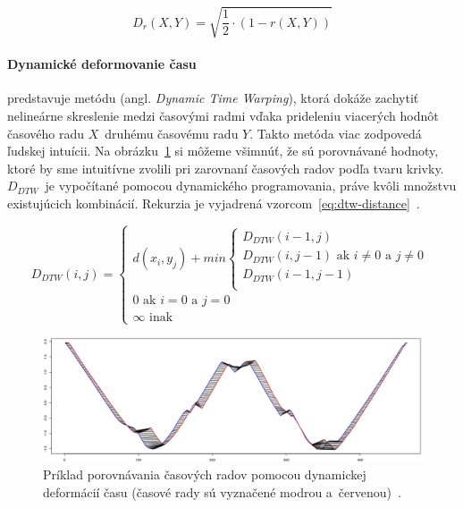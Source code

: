 \documentclass[a4paper,twoside,slovak,12pt,appendix]{article}
\begin{document}
\begin{equation}
	\label{eq:correlation-distance}
  D_r \left( X, Y \right) = \sqrt{\frac{1}{2} \cdot \left( 1 - r \left( X, Y \right) \right)}
\end{equation}


\paragraph{Dynamické deformovanie času} predstavuje metódu (angl.
\textit{Dynamic Time Warping}), ktorá dokáže zachytiť nelineárne skreslenie
medzi časovými radmi vďaka prideleniu viacerých hodnôt časového radu $X$~druhému
časovému radu $Y$. Takto metóda viac zodpovedá ľudskej intuícii. Na
obrázku~\ref{fig:warping-distance} si môžeme všimnúť, že sú porovnávané hodnoty,
ktoré by sme intuitívne zvolili pri zarovnaní časových radov podľa tvaru krivky.
$D_{DTW}$~je vypočítané pomocou dynamického programovania, práve kvôli množstvu
existujúcich kombinácií. Rekurzia je vyjadrená
vzorcom~\ref{eq:dtw-distance}~\cite{Dzeroski2007,Fu2011,Hsu2015}.

\begin{equation}
	\label{eq:dtw-distance}
  D_{DTW} \left( i, j \right) =
  \begin{cases}
    d \left( x_i, y_j \right) + min
    \begin{cases}
      D_{DTW} \left( i-1, j \right) \\
      D_{DTW} \left( i, j-1 \right) \text{ ak } i \neq 0 \text{ a } j \neq 0  \\
      D_{DTW} \left( i-1, j-1 \right) \\
    \end{cases} \\
    0 \text{ ak } i = 0 \text{ a } j = 0 \\
    \infty \text{ inak}
  \end{cases}
\end{equation}

\begin{figure}[htbp]
  \centering
  \includegraphics[width=\textwidth]{warping_distance.png}
  \caption[Príklad porovnávania časových radov pomocou dynamickej deformácií času.]{Príklad porovnávania časových radov pomocou dynamickej deformácií času (časové rady sú vyznačené modrou a~červenou)~\cite{Malinowski2017}.}
  \label{fig:warping-distance}
\end{figure}
\end{document}
